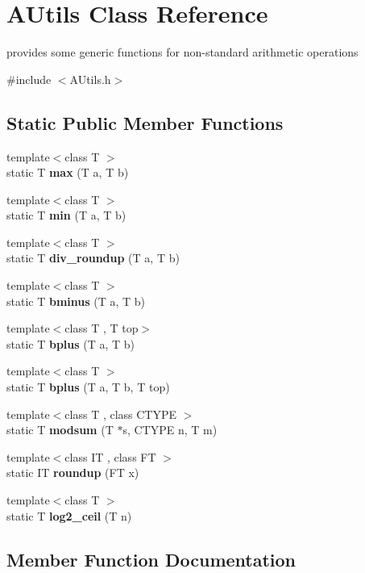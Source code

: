 \section{A\+Utils Class Reference}
\label{classAUtils}


provides some generic functions for non-\/standard arithmetic operations  




{\ttfamily \#include $<$A\+Utils.\+h$>$}

\subsection*{Static Public Member Functions}
\begin{DoxyCompactItemize}
\item 
{\footnotesize template$<$class T $>$ }\\static T \textbf{ max} (T a, T b)
\item 
{\footnotesize template$<$class T $>$ }\\static T \textbf{ min} (T a, T b)
\item 
{\footnotesize template$<$class T $>$ }\\static T \textbf{ div\+\_\+roundup} (T a, T b)
\item 
{\footnotesize template$<$class T $>$ }\\static T \textbf{ bminus} (T a, T b)
\item 
{\footnotesize template$<$class T , T top$>$ }\\static T \textbf{ bplus} (T a, T b)
\item 
{\footnotesize template$<$class T $>$ }\\static T \textbf{ bplus} (T a, T b, T top)
\item 
{\footnotesize template$<$class T , class C\+T\+Y\+PE $>$ }\\static T \textbf{ modsum} (T $\ast$s, C\+T\+Y\+PE n, T m)
\item 
{\footnotesize template$<$class IT , class FT $>$ }\\static IT \textbf{ roundup} (FT x)
\item 
{\footnotesize template$<$class T $>$ }\\static T \textbf{ log2\+\_\+ceil} (T n)
\end{DoxyCompactItemize}


\subsection{Member Function Documentation}
\mbox{\label{classAUtils_a913619524397350adb0e1c047b378a58}} 

